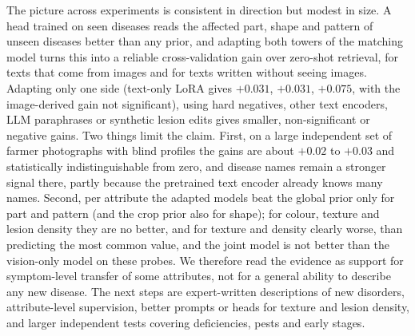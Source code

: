 \documentclass[11pt]{article}
\begin{document}
The picture across experiments is consistent in direction but modest in size. A head trained on seen diseases reads the affected part, shape and pattern of unseen diseases better than any prior, and adapting both towers of the matching model turns this into a reliable cross-validation gain over zero-shot retrieval, for texts that come from images and for texts written without seeing images. Adapting only one side (text-only LoRA gives $+0.031$, $+0.031$, $+0.075$, with the image-derived gain not significant), using hard negatives, other text encoders, LLM paraphrases or synthetic lesion edits gives smaller, non-significant or negative gains. Two things limit the claim. First, on a large independent set of farmer photographs with blind profiles the gains are about $+0.02$ to $+0.03$ and statistically indistinguishable from zero, and disease names remain a stronger signal there, partly because the pretrained text encoder already knows many names. Second, per attribute the adapted models beat the global prior only for part and pattern (and the crop prior also for shape); for colour, texture and lesion density they are no better, and for texture and density clearly worse, than predicting the most common value, and the joint model is not better than the vision-only model on these probes. We therefore read the evidence as support for symptom-level transfer of some attributes, not for a general ability to describe any new disease. The next steps are expert-written descriptions of new disorders, attribute-level supervision, better prompts or heads for texture and lesion density, and larger independent tests covering deficiencies, pests and early stages.
\end{document}
